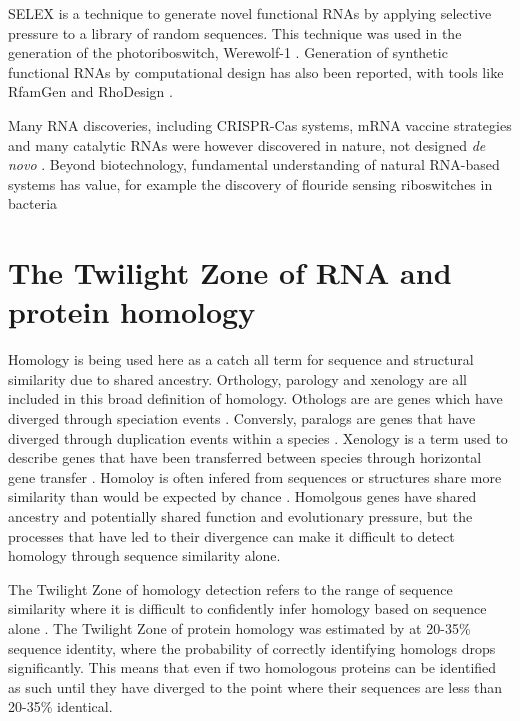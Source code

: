 
\ac{SELEX} is a technique to generate novel functional RNAs by applying selective pressure to a library of random sequences.
This technique was used in the generation of the photoriboswitch, Werewolf-1 \citep{Rotstan2020}.
Generation of synthetic functional RNAs by computational design has also been reported, with tools like RfamGen and RhoDesign \citep{Sumi2024}.

Many RNA discoveries, including \ac{CRISPR}-Cas systems, \ac{mRNA} vaccine strategies and many catalytic RNAs were however discovered in nature, not designed \emph{de novo} \citep{Micura2020,Barrangou2007}.
Beyond biotechnology, fundamental understanding of natural RNA-based systems has value, for example the discovery of flouride sensing riboswitches in bacteria \citep{}

\section{The Twilight Zone of RNA and protein homology}

Homology is being used here as a catch all term for sequence and structural similarity due to shared ancestry.
Orthology, parology and xenology are all included in this broad definition of homology.
Othologs are are genes which have diverged through speciation events \citep{Jensen2001}.
Conversly, paralogs are genes that have diverged through duplication events within a species \citep{Jensen2001}.
Xenology is a term used to describe genes that have been transferred between species through horizontal gene transfer \citep{Jensen2001}.
Homoloy is often infered from sequences or structures share more similarity than would be expected by chance \citep{Pearson2013}.
Homolgous genes have shared ancestry and potentially shared function and evolutionary pressure, but the processes that have led to their divergence can make it difficult to detect homology through sequence similarity alone.

The Twilight Zone of homology detection refers to the range of sequence similarity where it is difficult to confidently infer homology based on sequence alone \citep{Rost1999}.
The Twilight Zone of protein homology was estimated by \citet{Rost1999} at 20-35\% sequence identity, where the probability of correctly identifying homologs drops significantly.
This means that even if two homologous proteins can be identified as such until they have diverged to the point where their sequences are less than 20-35\% identical.

